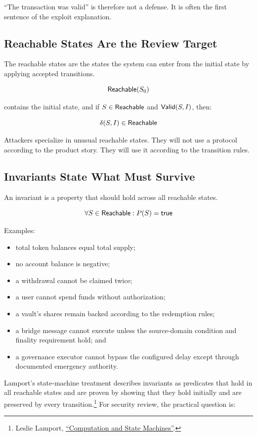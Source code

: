 ``The transaction was valid'' is therefore not a defense. It is often the first sentence of the exploit explanation.

\subsection{Reachable States Are the Review Target}

The reachable states are the states the system can enter from the initial state by applying accepted transitions.

\[
\mathsf{Reachable}(S_0)
\]

contains the initial state, and if \(S \in \mathsf{Reachable}\) and \(\mathsf{Valid}(S,I)\), then:

\[
\delta(S,I) \in \mathsf{Reachable}
\]

Attackers specialize in unusual reachable states. They will not use a protocol according to the product story. They will use it according to the transition rules.

\subsection{Invariants State What Must Survive}

An invariant is a property that should hold across all reachable states.

\[
\forall S \in \mathsf{Reachable}: P(S) = \mathsf{true}
\]

Examples:

\begin{itemize}
\item total token balances equal total supply;
\item no account balance is negative;
\item a withdrawal cannot be claimed twice;
\item a user cannot spend funds without authorization;
\item a vault's shares remain backed according to the redemption rules;
\item a bridge message cannot execute unless the source-domain condition and finality requirement hold; and
\item a governance executor cannot bypass the configured delay except through documented emergency authority.
\end{itemize}

Lamport's state-machine treatment describes invariants as predicates that hold in all reachable states and are proven by showing that they hold initially and are preserved by every transition.\footnote{Leslie Lamport, \href{https://lamport.azurewebsites.net/pubs/state-machine.pdf}{``Computation and State Machines''}.} For security review, the practical question is:

